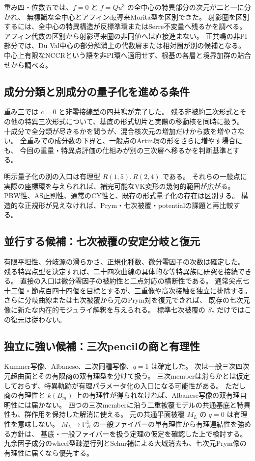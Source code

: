 重み四・位数五では、$f=0$ と $f=Qu^3$ の全中心の特異部分の次元が二と一に分かれ、
無標識な全中心とアフィンdg導来Morita型を区別できた。
射影圏を区別するには、全中心の特異構造が反標準環またはSerre不変量へ残るかを調べる。
アフィン代数の区別から射影導来圏の非同値へは直接進まない。
正共鳴の非PI部分では、Du Val中心の部分解消上の代数層または相対圏が別の候補となる。
中心上有限なNCCRという語を非PI環へ適用せず、根基の各層と境界加群の貼合せから調べる。

\subsection{成分分類と別成分の量子化を進める条件}
重み三では $c=0$ と非零接線型の四共鳴が完了した。
残る非被約三次形式とその他の特異三次形式について、基底の形式切片と実際の移動核を同時に扱う。
十成分で全分類が尽きるかを問うが、混合核次元の増加だけから数を増やさない。
全重みでの成分数の下界と、一般点のArtin環の形をさらに増やす場合にも、
今回の重量・特異点評価の仕組みが別の三次層へ移るかを判断基準とする。

明示量子化の別の入口は有理型 $R(1,5),R(2,4)$ である。
それらの一般点に実際の座標環を与えられれば、補完可能なVK変形の幾何的範囲が広がる。
PBW性、AS正則性、通常のCY性と、既存の形式量子化の存在は区別する。
構造的な正規形が見えなければ、Prym・七次被覆・potentialの課題と再比較する。

\subsection{並行する候補：七次被覆の安定分岐と復元}

有限平坦性、分岐源の滑らかさ、正規化種数、微分零因子の次数は確定した。
残る特異点型を決定すれば、二十四次曲線の具体的な等特異族に研究を接続できる。
直接の入口は微分零因子の被約性と二点対応の横断性である。
通常尖点七十二個・節点百四十四個を目標とするが、三重像や高次接触を独立に排除する。
さらに分岐曲線または七次被覆から元のPrym対を復元できれば、
既存の七次元像に新たな内在的モジュライ解釈を与えられる。
標準七次被覆の $S_7$ だけではこの復元は従わない。

\subsection{独立に強い候補：三次pencilの商と有理性}
Kummer写像、Albanese、二次同種写像、$q=1$ は確定した。
次は一般三次四次元超曲面とその有限商の双有理型を分けて扱う。
三次memberは滑らかとは仮定しておらず、特異軌跡が有理パラメータ化の入口になる可能性がある。
ただし商の有理性と $k(B_m)$ 上の有理性が得られなければ、Albanese写像の双有理自明性には届かない。
四つの三次memberに沿う二重被覆モデルの共通基底と特異性も、群作用を保持した解消に使える。
元の共通平面被覆 $M_L$ の $q=0$ は有理性を意味しない。
$M_L\to\mathbb P^1_R$ の一般ファイバーの単有理性から有理連結性を強める方針は、
基底・一般ファイバーを扱う定理の仮定を確認した上で検討する。
九余因子成分のwheel型疎逆行列とSchur補による大域消去も、七次元Prym像の有理性に届くなら優先する。

